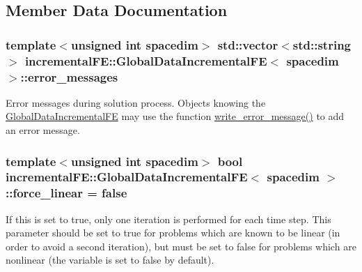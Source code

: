 \subsection{Member Data Documentation}
\subsubsection[{\texorpdfstring{error\+\_\+messages}{error_messages}}]{\setlength{\rightskip}{0pt plus 5cm}template$<$unsigned int spacedim$>$ std\+::vector$<$std\+::string$>$ {\bf incremental\+F\+E\+::\+Global\+Data\+Incremental\+FE}$<$ spacedim $>$\+::error\+\_\+messages\hspace{0.3cm}{\ttfamily [private]}}\hypertarget{classincremental_f_e_1_1_global_data_incremental_f_e_a47301f72bcb3852b2519b23de833f3eb}{}\label{classincremental_f_e_1_1_global_data_incremental_f_e_a47301f72bcb3852b2519b23de833f3eb}
Error messages during solution process. Objects knowing the \hyperlink{classincremental_f_e_1_1_global_data_incremental_f_e}{Global\+Data\+Incremental\+FE} may use the function \hyperlink{classincremental_f_e_1_1_global_data_incremental_f_e_a9845e6a20c93b8aec769238ac23106da}{write\+\_\+error\+\_\+message()} to add an error message. 
\subsubsection[{\texorpdfstring{force\+\_\+linear}{force_linear}}]{\setlength{\rightskip}{0pt plus 5cm}template$<$unsigned int spacedim$>$ bool {\bf incremental\+F\+E\+::\+Global\+Data\+Incremental\+FE}$<$ spacedim $>$\+::force\+\_\+linear = false\hspace{0.3cm}{\ttfamily [private]}}\hypertarget{classincremental_f_e_1_1_global_data_incremental_f_e_a37c1d42902e74f13f3c4ba82d2dabd67}{}\label{classincremental_f_e_1_1_global_data_incremental_f_e_a37c1d42902e74f13f3c4ba82d2dabd67}
If this is set to {\ttfamily true}, only one iteration is performed for each time step. This parameter should be set to {\ttfamily true} for problems which are known to be linear (in order to avoid a second iteration), but must be set to {\ttfamily false} for problems which are nonlinear (the variable is set to {\ttfamily false} by default). 
